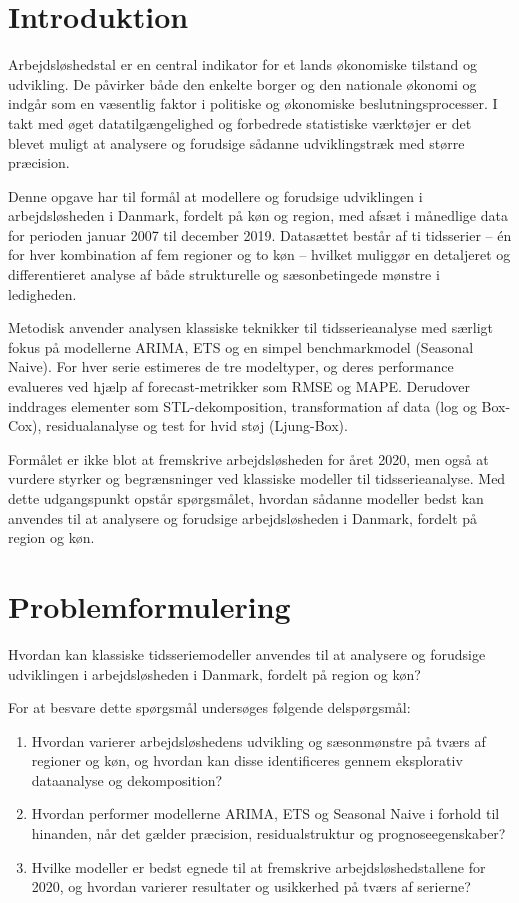 \documentclass[
]{article}
\begin{document}
\section{Introduktion}\label{introduktion}

Arbejdsløshedstal er en central indikator for et lands økonomiske
tilstand og udvikling. De påvirker både den enkelte borger og den
nationale økonomi og indgår som en væsentlig faktor i politiske og
økonomiske beslutningsprocesser. I takt med øget datatilgængelighed og
forbedrede statistiske værktøjer er det blevet muligt at analysere og
forudsige sådanne udviklingstræk med større præcision.

Denne opgave har til formål at modellere og forudsige udviklingen i
arbejdsløsheden i Danmark, fordelt på køn og region, med afsæt i
månedlige data for perioden januar 2007 til december 2019. Datasættet
består af ti tidsserier -- én for hver kombination af fem regioner og to
køn -- hvilket muliggør en detaljeret og differentieret analyse af både
strukturelle og sæsonbetingede mønstre i ledigheden.

Metodisk anvender analysen klassiske teknikker til tidsserieanalyse med
særligt fokus på modellerne ARIMA, ETS og en simpel benchmarkmodel
(Seasonal Naive). For hver serie estimeres de tre modeltyper, og deres
performance evalueres ved hjælp af forecast-metrikker som RMSE og MAPE.
Derudover inddrages elementer som STL-dekomposition, transformation af
data (log og Box-Cox), residualanalyse og test for hvid støj
(Ljung-Box).

Formålet er ikke blot at fremskrive arbejdsløsheden for året 2020, men
også at vurdere styrker og begrænsninger ved klassiske modeller til
tidsserieanalyse. Med dette udgangspunkt opstår spørgsmålet, hvordan
sådanne modeller bedst kan anvendes til at analysere og forudsige
arbejdsløsheden i Danmark, fordelt på region og køn.

\section{Problemformulering}\label{problemformulering}

Hvordan kan klassiske tidsseriemodeller anvendes til at analysere og
forudsige udviklingen i arbejdsløsheden i Danmark, fordelt på region og
køn?

For at besvare dette spørgsmål undersøges følgende delspørgsmål:

\begin{enumerate}
\def\labelenumi{\arabic{enumi}.}
\item
  Hvordan varierer arbejdsløshedens udvikling og sæsonmønstre på tværs
  af regioner og køn, og hvordan kan disse identificeres gennem
  eksplorativ dataanalyse og dekomposition?
\item
  Hvordan performer modellerne ARIMA, ETS og Seasonal Naive i forhold
  til hinanden, når det gælder præcision, residualstruktur og
  prognoseegenskaber?
\item
  Hvilke modeller er bedst egnede til at fremskrive
  arbejdsløshedstallene for 2020, og hvordan varierer resultater og
  usikkerhed på tværs af serierne?
\end{enumerate}
\end{document}
